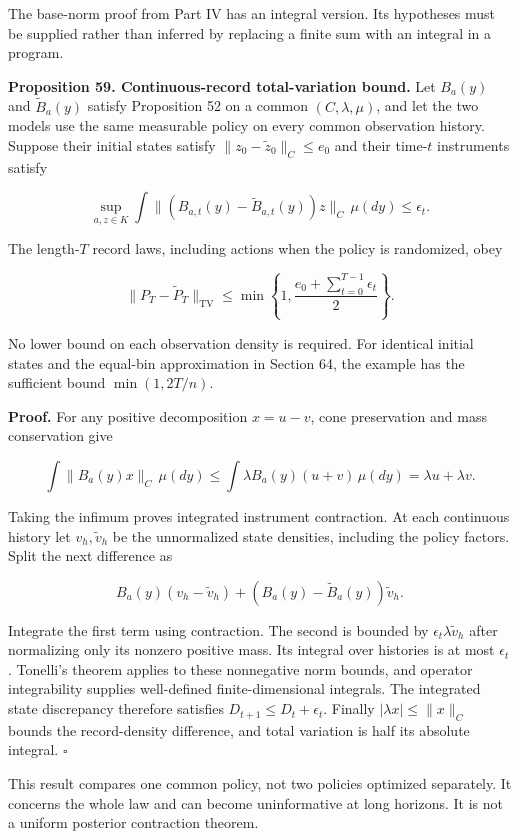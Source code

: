 \documentclass[11pt,letterpaper]{article}
\begin{document}
The base-norm proof from Part IV has an integral version. Its hypotheses
must be supplied rather than inferred by replacing a finite sum with an
integral in a program.

\textbf{Proposition 59. Continuous-record total-variation bound.} Let
\(B_a(y)\) and \(\widetilde B_a(y)\) satisfy Proposition 52 on a common
\((C,\lambda,\mu)\), and let the two models use the same measurable
policy on every common observation history. Suppose their initial states
satisfy \(\|z_0-\widetilde z_0\|_C\leq e_0\) and their time-\(t\)
instruments satisfy

\[
\sup_{a,z\in K}\int\|(B_{a,t}(y)-\widetilde B_{a,t}(y))z\|_C\,\mu(dy)
\leq\epsilon_t.
\]

The length-\(T\) record laws, including actions when the policy is
randomized, obey

\[
\boxed{
\|P_T-\widetilde P_T\|_{\mathrm{TV}}
\leq\min\left\{1,\frac{e_0+\sum_{t=0}^{T-1}\epsilon_t}{2}\right\}.
}
\]

No lower bound on each observation density is required. For identical
initial states and the equal-bin approximation in Section 64, the
example has the sufficient bound \(\min(1,2T/n)\).

\textbf{Proof.} For any positive decomposition \(x=u-v\), cone
preservation and mass conservation give

\[
\int\|B_a(y)x\|_C\,\mu(dy)
\leq\int\lambda B_a(y)(u+v)\,\mu(dy)
=\lambda u+\lambda v.
\]

Taking the infimum proves integrated instrument contraction. At each
continuous history let \(v_h,\widetilde v_h\) be the unnormalized state
densities, including the policy factors. Split the next difference as

\[
B_a(y)(v_h-\widetilde v_h)
+(B_a(y)-\widetilde B_a(y))\widetilde v_h.
\]

Integrate the first term using contraction. The second is bounded by
\(\epsilon_t\lambda\widetilde v_h\) after normalizing only its nonzero
positive mass. Its integral over histories is at most \(\epsilon_t\).
Tonelli's theorem applies to these nonnegative norm bounds, and operator
integrability supplies well-defined finite-dimensional integrals. The
integrated state discrepancy therefore satisfies
\(D_{t+1}\leq D_t+\epsilon_t\). Finally \(|\lambda x|\leq\|x\|_C\)
bounds the record-density difference, and total variation is half its
absolute integral. \(\square\)

This result compares one common policy, not two policies optimized
separately. It concerns the whole law and can become uninformative at
long horizons. It is not a uniform posterior contraction theorem.
\end{document}
